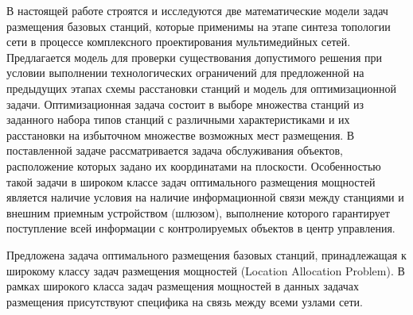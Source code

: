 В настоящей работе строятся и исследуются две математические модели задач размещения базовых станций, которые применимы на этапе синтеза топологии сети в процессе комплексного проектирования мультимедийных сетей. Предлагается модель для проверки существования допустимого решения при условии выполнении технологических ограничений для предложенной на предыдущих этапах схемы расстановки станций и модель для оптимизационной задачи. Оптимизационная задача состоит в выборе множества станций из заданного набора типов станций с различными характеристиками и их расстановки на избыточном множестве возможных мест размещения. В поставленной задаче рассматривается задача обслуживания объектов, расположение которых задано их координатами на плоскости. Особенностью такой задачи в широком классе задач оптимального размещения мощностей является наличие условия на наличие информационной связи между станциями и внешним приемным устройством (шлюзом), выполнение которого гарантирует поступление всей информации с контролируемых объектов в центр управления. 

Предложена задача оптимального размещения базовых станций, принадлежащая к широкому классу задач размещения мощностей (Location Allocation Problem). В рамках широкого класса задач размещения мощностей в данных задачах размещения присутствуют специфика на связь между всеми узлами сети. 







